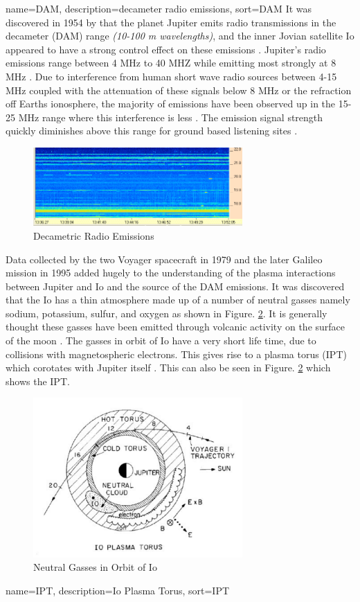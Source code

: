 \documentclass[runningheads,a4paper]{llncs}
\begin{document}
{
  name={DAM},
  description={decameter radio emissions},
  sort=DAM
}
%
It was discovered in 1954 by \cite{burke55} that the planet Jupiter emits radio transmissions in the decameter (\gls{DAM}) range \textit{(10-100 m wavelengths)}, and the inner Jovian satellite Io appeared to have a strong control effect on these emissions \citep{belcher87}. Jupiter's radio emissions range between 4 MHz to 40 MHZ while emitting most strongly at 8 MHz  \citep{wilkinson94}. Due to interference from human short wave radio sources between 4-15 MHz coupled with the attenuation of these signals below 8 MHz or the refraction off Earths ionosphere, the majority of emissions have been observed up in the 15-25 MHz range where this interference is less \citep{wilkinson94}. The emission signal strength quickly diminishes above this range for ground based listening sites \citep{wilkinson94}.
%
\begin{figure}[here]
\centering
\includegraphics[width=8cm]{images/01}
\caption{Decametric Radio Emissions \citep{ashcraft13}}
\label{fig:dam_Emissions}
\end{figure}
%

Data collected by the two Voyager spacecraft in 1979 \citep{belcher87} and the later Galileo mission in 1995 \citep{kivelson96} added hugely to the understanding of the plasma interactions between Jupiter and Io and the source of the \gls{DAM} emissions. It was discovered that the Io has a thin atmosphere made up of a number of neutral gasses namely sodium, potassium, sulfur, and oxygen as shown in Figure. \ref{fig:io_neutral_gasses}. It is generally thought these gasses have been emitted through volcanic activity on the surface of the moon \citep{belcher87}. The gasses in orbit of Io have a very short life time, due to collisions with magnetospheric electrons. This gives rise to a plasma torus (\gls{IPT}) which corotates with Jupiter itself \citep{belcher87}. This can also be seen in Figure. \ref{fig:io_neutral_gasses} which shows the \gls{IPT}.
%
\begin{figure}[here]
\centering
\includegraphics[width=8cm]{images/02}
\caption{Neutral Gasses in Orbit of Io \citep{belcher87}}
\label{fig:io_neutral_gasses}
\end{figure}
%
{
  name={IPT},
  description={Io Plasma Torus},
  sort=IPT
}
%
\end{document}
